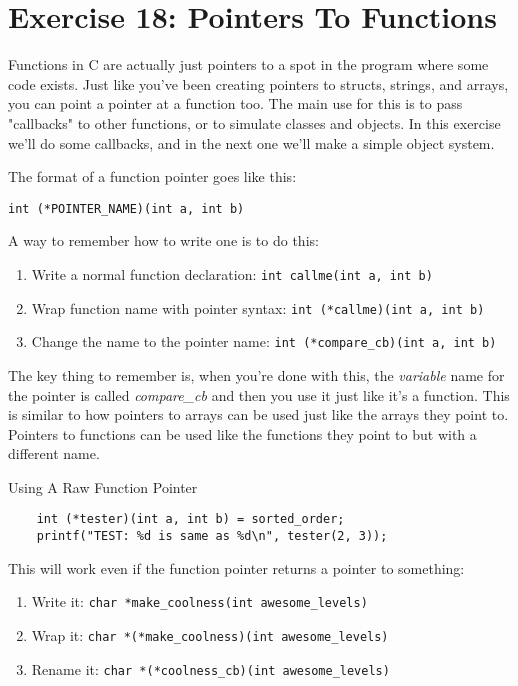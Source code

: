 \chapter{Exercise 18: Pointers To Functions}

Functions in C are actually just pointers to a spot in the
program where some code exists.  Just like you've been creating
pointers to structs, strings, and arrays, you can point a
pointer at a function too.  The main use for this is to pass
"callbacks" to other functions, or to simulate classes and
objects.  In this exercise we'll do some callbacks, and in
the next one we'll make a simple object system.

The format of a function pointer goes like this:

\verb|int (*POINTER_NAME)(int a, int b)|

A way to remember how to write one is to do this:

\begin{enumerate}
\item Write a normal function declaration: \verb|int callme(int a, int b)|
\item Wrap function name with pointer syntax: \verb|int (*callme)(int a, int b)|
\item Change the name to the pointer name: \verb|int (*compare_cb)(int a, int b)|
\end{enumerate}

The key thing to remember is, when you're done with this, the \emph{variable}
name for the pointer is called \emph{compare\_cb} and then you use it
just like it's a function.  This is similar to how pointers to arrays can
be used just like the arrays they point to.  Pointers to functions can be
used like the functions they point to but with a different name.

\begin{code}{Using A Raw Function Pointer}
\begin{lstlisting}
    int (*tester)(int a, int b) = sorted_order;
    printf("TEST: %d is same as %d\n", tester(2, 3));
\end{lstlisting}
\end{code}

This will work even if the function pointer returns a pointer to something:

\begin{enumerate}
\item Write it: \verb|char *make_coolness(int awesome_levels)|
\item Wrap it: \verb|char *(*make_coolness)(int awesome_levels)|
\item Rename it: \verb|char *(*coolness_cb)(int awesome_levels)|
\end{enumerate}

